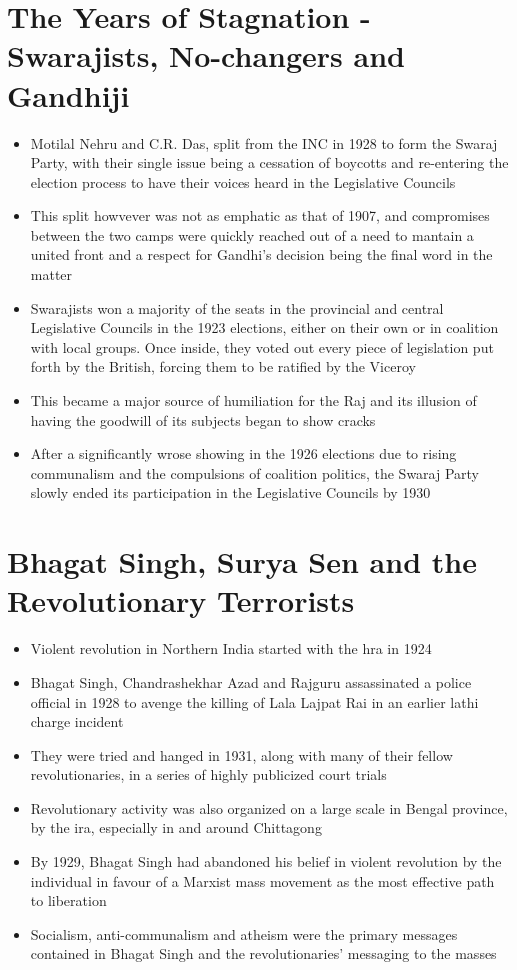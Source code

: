\section{The Years of Stagnation - Swarajists, No-changers and Gandhiji}
\begin{itemize}
    \item Motilal Nehru and C.R. Das, split from the INC in 1928 to form the Swaraj Party, with their single issue being a cessation of boycotts and re-entering the election process to have their voices heard in the Legislative Councils
    \item This split howvever was not as emphatic as that of 1907, and compromises between the two camps were quickly reached out of a need to mantain a united front and a respect for Gandhi's decision being the final word in the matter
    \item Swarajists won a majority of the seats in the provincial and central Legislative Councils in the 1923 elections, either on their own or in coalition with local groups. Once inside, they voted out every piece of legislation put forth by the British, forcing them to be ratified by the Viceroy
    \item This became a major source of humiliation for the Raj and its illusion of having the goodwill of its subjects began to show cracks
    \item After a significantly wrose showing in the 1926 elections due to rising communalism and the compulsions of coalition politics, the Swaraj Party slowly ended its participation in the Legislative Councils by 1930
\end{itemize}

\section{Bhagat Singh, Surya Sen and the Revolutionary Terrorists}
\begin{itemize}
    \item Violent revolution in Northern India started with the \acrshort{hra} in 1924
    \item Bhagat Singh, Chandrashekhar Azad and Rajguru assassinated a police official in 1928 to avenge the killing of Lala Lajpat Rai in an earlier lathi charge incident
    \item They were tried and hanged in 1931, along with many of their fellow revolutionaries, in a series of highly publicized court trials
    \item Revolutionary activity was also organized on a large scale in Bengal province, by the \acrshort{ira}, especially in and around Chittagong
    \item By 1929, Bhagat Singh had abandoned his belief in violent revolution by the individual in favour of a Marxist mass movement as the most effective path to liberation
    \item Socialism, anti-communalism and atheism were the primary messages contained in Bhagat Singh and the revolutionaries' messaging to the masses
\end{itemize}

